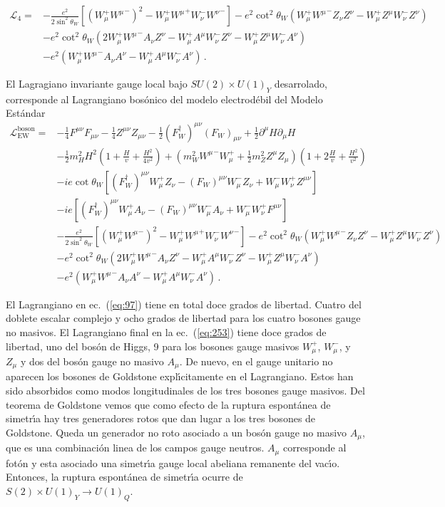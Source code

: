 \begin{align}
\mathcal{L}_4=  &-\frac{e^2}{2\sin^2\theta_W}\left[\left(W_\mu^+{W^\mu}^-\right)^2-W_\mu^+{W^\mu}^+W_\nu^-{W^\nu}^-\right]
-e^2\cot^2\theta_W\left(W_\mu^+{W^\mu}^-Z_\nu Z^\nu-W_\mu^+Z^\mu W_\nu^-Z^\nu\right)\nonumber\\
&-e^2\cot^2\theta_W\left(2W_\mu^+{W^\mu}^-A_\nu Z^\nu-W_\mu^+A^\mu W_\nu^-Z^\nu-W_\mu^+Z^\mu W_\nu^-A^\nu\right)\nonumber\\
&-e^2\left(W_\mu^+{W^\mu}^-A_\nu A^\nu-W_\mu^+A^\mu W_\nu^-A^\nu\right)\,.
\end{align}

El Lagragiano invariante gauge local bajo $SU(2)\times U(1)_Y$ desarrolado, corresponde al Lagrangiano bos\'onico del modelo electrod\'ebil del Modelo Est\'andar
\begin{align}
\label{eq:253}
\mathcal{L}_{\text{EW}}^{\text{boson}}=&
-\tfrac{1}{4}F^{\mu\nu} F_{\mu\nu}-\tfrac{1}{4}Z^{\mu\nu} Z_{\mu\nu}-\tfrac{1}{2}(F_W^\dagger)^{\mu\nu} (F_W)_{\mu\nu}
+\tfrac{1}{2}\partial^\mu H\partial_\mu H\nonumber\\
&-\frac{1}{2}m_H^2H^2\left(1+\frac{H}{v}+\frac{H^2}{4v^2}\right)
+\left(m_W^2{W^\mu}^-W_\mu^++\frac{1}{2}m_Z^2Z^\mu Z_\mu\right)\left(1+2\frac{H}{v}+\frac{H^2}{v^2}\right)\nonumber\\
&-ie\cot\theta_W\left[(F_W^\dagger)^{\mu\nu}W_\mu^+ Z_\nu-(F_W)^{\mu\nu}W_\mu^- Z_\nu+W_\mu^-W_\nu^+Z^{\mu\nu}\right]\nonumber\\
&-ie\left[(F_W^\dagger)^{\mu\nu}W_\mu^+ A_\nu-(F_W)^{\mu\nu}W_\mu^- A_\nu+W_\mu^-W_\nu^+F^{\mu\nu}\right]\nonumber\\
&-\frac{e^2}{2\sin^2\theta_W}\left[\left(W_\mu^+{W^\mu}^-\right)^2-W_\mu^+{W^\mu}^+W_\nu^-{W^\nu}^-\right]
-e^2\cot^2\theta_W\left(W_\mu^+{W^\mu}^-Z_\nu Z^\nu-W_\mu^+Z^\mu W_\nu^-Z^\nu\right)\nonumber\\
&-e^2\cot^2\theta_W\left(2W_\mu^+{W^\mu}^-A_\nu Z^\nu-W_\mu^+A^\mu W_\nu^-Z^\nu-W_\mu^+Z^\mu W_\nu^-A^\nu\right)\nonumber\\
&-e^2\left(W_\mu^+{W^\mu}^-A_\nu A^\nu-W_\mu^+A^\mu W_\nu^-A^\nu\right)\,.
\end{align}


El Lagrangiano en ec.~(\ref{eq:97}) tiene en total doce  grados de libertad. Cuatro del doblete escalar complejo y ocho grados de libertad para los cuatro bosones gauge no masivos. El Lagrangiano final en la ec.~(\ref{eq:253}) tiene doce grados de libertad, uno del bos\'on de Higgs, 9 para los bosones gauge masivos $W_\mu^+$,  $W_\mu^-$, y $Z_\mu$ y dos del bos\'on gauge no masivo $A_\mu$. De nuevo, en el gauge unitario no aparecen los bosones de Goldstone expl\'\i citamente en el Lagrangiano. Estos han sido absorbidos como modos longitudinales de los tres bosones gauge masivos. Del teorema de Goldstone vemos que como efecto de la ruptura espont\'anea de simetr\'\i a hay tres generadores rotos que dan lugar a los tres bosones de Goldstone. Queda un generador no roto asociado a un bos\'on gauge no masivo $A_\mu$, que es una combinaci\'on linea de los campos gauge neutros. $A_\mu$ corresponde al fot\'on y esta asociado una simetr\'\i a gauge local abeliana remanente  del vac\'\i o. Entonces, la ruptura espont\'anea de simetr\'\i a ocurre de $S(2)\times U(1)_Y\to U(1)_Q$. 

